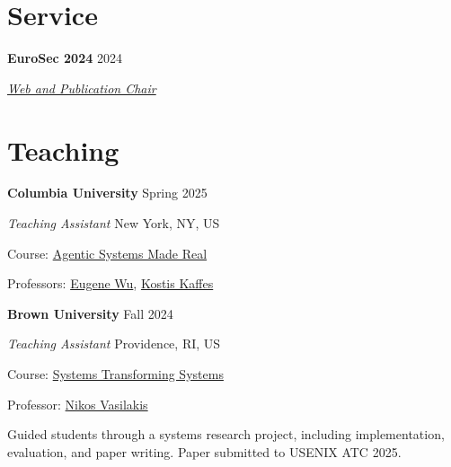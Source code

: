 \documentclass[margin,12pt]{resume}
\newcommand{\descriptionVSpace}{\vspace{0.5ex}\xspace}
\newcommand{\subsectionVSpace}{\vspace{3.5ex}\xspace}
\newcommand{\sectionVSpace}{\vspace{1ex}\xspace} %
\newcommand{\sectionVSpaceCorrection}{\vspace{-3.5ex}} %
\newcommand{\header}[1]{\textbf{#1}\xspace}
\newcommand{\institution}[1]{\header{#1}\xspace}
\newcommand{\place}[1]{#1\xspace}
\newcommand{\role}[1]{\textit{#1}\xspace}
\newcommand{\service}[1]{\header{#1}\xspace}
\newcommand{\singleDate}[1]{#1\xspace}
\newcommand{\stitle}[1]{#1:\xspace}
\newenvironment{rSubsection}{}{\par\subsectionVSpace}
\newenvironment{rSection}[1]{\sectionVSpaceCorrection\section{#1}\xspace}{\sectionVSpace\par}
\newenvironment{jobDuties}{\descriptionVSpace}{\par}
\begin{document}
\begin{resume}
\begin{rSection}{Service}
        \begin{rSubsection}
            \service{EuroSec 2024} \hfill 2024

            \role{\href{https://secopera.eu/eurosec-2024/}{Web and Publication Chair}}
        \end{rSubsection}
    \end{rSection}

    \begin{rSection}{Teaching}




        \begin{rSubsection}
            \institution{Columbia University} \hfill \singleDate{Spring 2025}

            \role{Teaching Assistant} \hfill \place{New York, NY, US}

            \stitle{Course} \href{https://w6113.github.io/}{Agentic Systems Made Real}

            \stitle{Professors} \href{https://www.cs.columbia.edu/~ewu/}{Eugene Wu}, \href{https://www.cs.columbia.edu/~kkaffes/index.html}{Kostis Kaffes}
        \end{rSubsection}

        \begin{rSubsection}
            \institution{Brown University} \hfill \singleDate{Fall 2024}

            \role{Teaching Assistant} \hfill \place{Providence, RI, US}

            \stitle{Course} \href{https://cs.brown.edu/courses/csci2952r/}{Systems Transforming Systems}

            \stitle{Professor} \href{https://nikos.vasilak.is}{Nikos Vasilakis}

            \begin{jobDuties}
                Guided students through a systems research project, including implementation, evaluation, and paper writing.
                Paper submitted to USENIX ATC 2025.
            \end{jobDuties}
        \end{rSubsection}


\end{rSection}
\end{resume}
\end{document}
